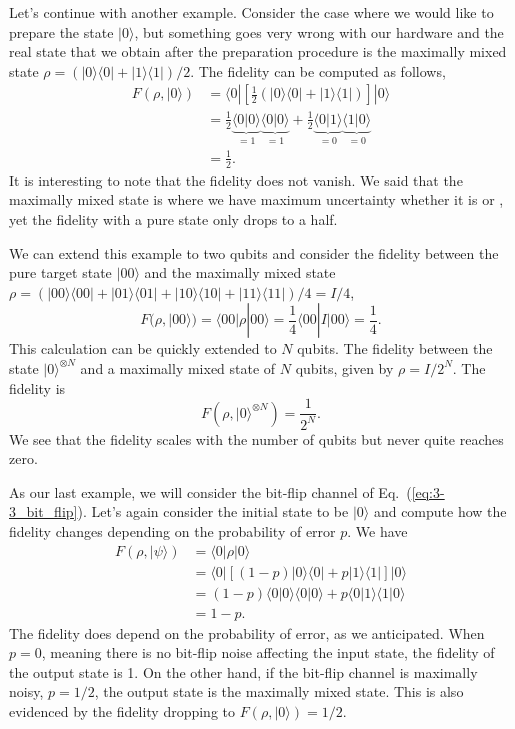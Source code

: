 Let's continue with another example.
Consider the case where we would like to prepare the state $|0\rangle$, but something goes very wrong with our hardware and the real state that we obtain after the preparation procedure is the maximally mixed state $\rho = (|0\rangle\langle0| + |1\rangle\langle1|)/2$.
The fidelity can be computed as follows,
\begin{align}
    F(\rho,|0\rangle) & = \langle 0 | \left[\frac{1}{2}(|0\rangle\langle0| + |1\rangle\langle1|)\right] | 0 \rangle \nonumber\\
    & = \frac{1}{2} \underbrace{\langle0|0\rangle}_{=1} \underbrace{\langle0|0\rangle}_{=1} + \frac{1}{2} \underbrace{\langle0|1\rangle}_{=0} \underbrace{\langle1|0\rangle}_{=0} \nonumber\\
    & = \frac{1}{2}.
\end{align}
It is interesting to note that the fidelity does not vanish.
We said that the maximally mixed state is where we have maximum uncertainty whether it is  or , yet the fidelity with a pure state only drops to a half.

We can extend this example to two qubits and consider the fidelity between the pure target state $|00\rangle$ and the maximally mixed state $\rho = (|00\rangle\langle00|+|01\rangle\langle01|+|10\rangle\langle10|+|11\rangle\langle11|)/4=I/4$,
\begin{equation}
    F(\rho, |00\rangle) = \langle00| \rho | 00\rangle = \frac{1}{4} \langle 00| I |00\rangle = \frac{1}{4}.
\end{equation}
This calculation can be quickly extended to $N$ qubits.
The fidelity between the state $|0\rangle^{\otimes N}$ and a maximally mixed state of $N$ qubits, given by $\rho=I/2^N$.
The fidelity is
\begin{equation}
    F(\rho,|0\rangle^{\otimes N}) = \frac{1}{2^N}.
\end{equation}
We see that the fidelity scales with the number of qubits but never quite reaches zero.

As our last example, we will consider the bit-flip channel of Eq.~(\ref{eq:3-3_bit_flip}).
Let's again consider the initial state to be $|0\rangle$ and compute how the fidelity changes depending on the probability of error $p$.
We have
\begin{align}
    F(\rho,|\psi\rangle) & = \langle0| \rho | 0\rangle \\
    & = \langle0| \left[ (1-p)|0\rangle\langle0| + p|1\rangle\langle1| \right] |0\rangle \nonumber\\
    & = (1-p) \langle0|0\rangle \langle0|0\rangle + p \langle0|1\rangle \langle1|0\rangle \nonumber\\
    & = 1 - p.
\end{align}
The fidelity does depend on the probability of error, as we anticipated.
When $p=0$, meaning there is no bit-flip noise affecting the input state, the fidelity of the output state is 1.
On the other hand, if the bit-flip channel is maximally noisy, $p=1/2$, the output state is the maximally mixed state.
This is also evidenced by the fidelity dropping to $F(\rho,|0\rangle)=1/2$.

